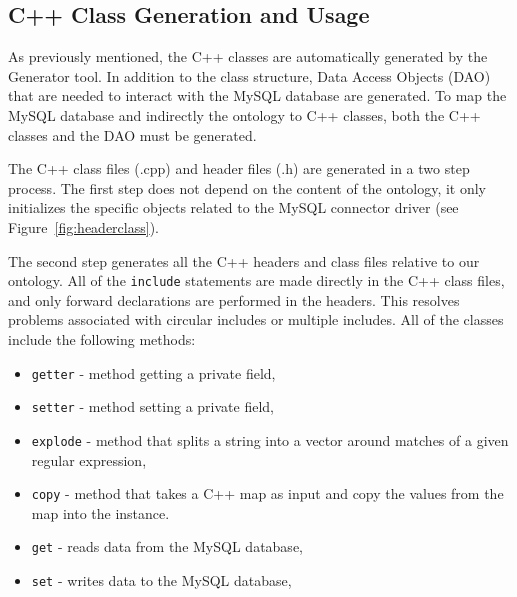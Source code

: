 \subsection{C++ Class Generation and Usage}
As previously mentioned, the C++ classes are automatically generated by the Generator tool. In addition to the class structure, 
Data Access Objects (DAO) that are needed to interact with the MySQL database are generated. 
To map the MySQL database and indirectly the ontology to C++ classes, both the C++ classes and
the DAO must be generated.

The C++ class files (.cpp) and header files (.h) are generated in a two step process.
The first step does not depend on the content of the ontology, it only initializes the specific objects related to the MySQL connector driver
(see Figure~\ref{fig:headerclass}).

The second step generates all the C++ headers and class files relative to our ontology. 
All of the \texttt{include} statements  are made directly in the C++ class files, and only forward declarations are performed in the headers. 
This resolves problems associated with circular includes or multiple includes. All of the classes include the following methods:
\begin{itemize}
\item \texttt{getter} - method getting a private field,
\item \texttt{setter} - method setting a private field,
\item \texttt{explode} - method that splits a string into a vector around matches of a given regular expression, 
\item \texttt{copy} -  method that takes a C++ map as input and copy the values from the map into the instance. 
\item \texttt{get} - reads data from the MySQL database,
\item \texttt{set} - writes data to the MySQL database,
\end{itemize}

